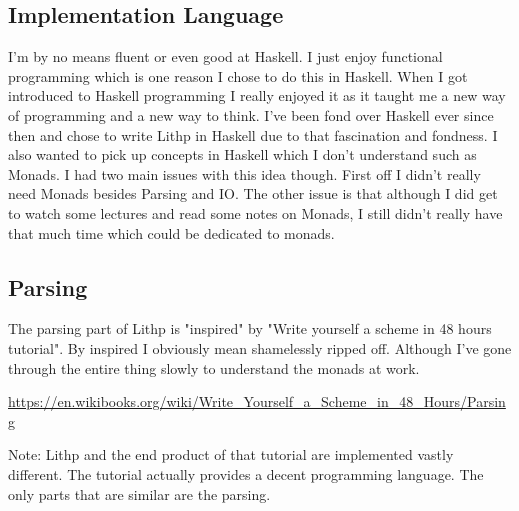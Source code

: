 \documentclass[14pt,a4paper]{article}
\begin{document}
\subsection{Implementation Language}
I'm by no means fluent or even good at Haskell. I just enjoy functional programming which is one reason I chose to do this in Haskell.
When I got introduced to Haskell programming I really enjoyed it as it taught me a new way of programming and a new way to think.
I've been fond over Haskell ever since then and chose to write Lithp in Haskell due to that fascination and fondness.
I also wanted to pick up concepts in Haskell which I don't understand such as Monads. I had two main issues with this idea though.
First off I didn't really need Monads besides Parsing and IO. The other issue is that although I did get to watch some lectures
and read some notes on Monads, I still didn't really have that much time which could be dedicated to monads.

\subsection{Parsing}
The parsing part of Lithp is "inspired" by "Write yourself a scheme in 48 hours tutorial". By inspired I obviously mean shamelessly
ripped off. Although I've gone through the entire thing slowly to understand the monads at work.

\url{https://en.wikibooks.org/wiki/Write_Yourself_a_Scheme_in_48_Hours/Parsing}

Note: Lithp and the end product of that tutorial are implemented vastly different. The tutorial actually provides a decent programming language.
The only parts that are similar are the parsing.
\end{document}
